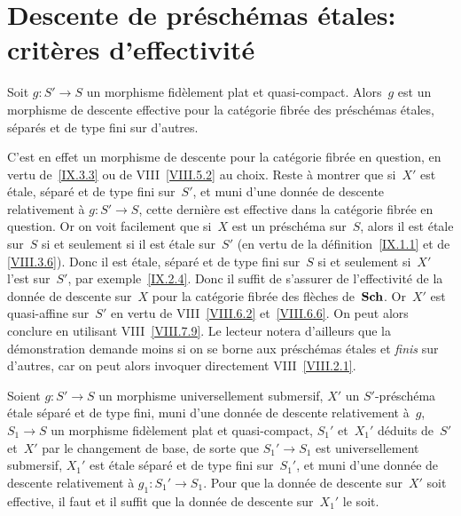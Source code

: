\section{Descente de pr\'esch\'emas \'etales: crit\`eres
d'effectivit\'e}
\label{IX.4}

\enlargethispage{.7cm}\begin{proposition}
\label{IX.4.1}
Soit $g\colon S'\to S$ un morphisme fid\`element plat et
quasi-compact. Alors~$g$ est un morphisme de descente effective pour
la cat\'egorie fibr\'ee des pr\'esch\'emas \'etales,
s\'epar\'es et de type fini sur d'autres.
\end{proposition}

C'est en effet un morphisme de descente pour la cat\'egorie
fibr\'ee en question, en vertu de~\ref{IX.3.3} ou de
VIII~\ref{VIII.5.2} au choix. Reste \`a montrer que si~$X'$ est
\'etale, s\'epar\'e et de type fini sur~$S'$, et muni d'une
donn\'ee de descente relativement \`a $g\colon S'\to S$, cette
derni\`ere est effective dans la cat\'egorie fibr\'ee en
question. Or on voit facilement que si~$X$ est un pr\'esch\'ema
sur~$S$, alors
il est \'etale sur~$S$ si et seulement si il est \'etale sur~$S'$
(en vertu de la d\'efinition~\ref{IX.1.1} et de \loccit \ref{VIII.3.6}). Donc il est \'etale, s\'epar\'e et de
type fini sur~$S$ si et seulement si~$X'$ l'est sur~$S'$, \cf par
exemple~\ref{IX.2.4}. Donc il suffit de s'assurer de
l'effectivit\'e de la donn\'ee de descente sur~$X$ pour la
cat\'egorie fibr\'ee des fl\`eches de~$\mathbf{Sch}$. Or~$X'$ est
quasi-affine sur~$S'$ en vertu de VIII~\ref{VIII.6.2}
et~\ref{VIII.6.6}. On peut alors conclure en utilisant
VIII~\ref{VIII.7.9}. Le lecteur notera d'ailleurs que la
d\'emonstration demande moins si on se borne aux pr\'esch\'emas
\'etales et \emph{finis} sur d'autres, car on peut alors invoquer
directement VIII~\ref{VIII.2.1}.

\begin{corollaire}
\label{IX.4.2}
Soient $g\colon S'\to S$ un morphisme universellement submersif, $X'$
un
$S'$-pr\'esch\'ema
\'etale s\'epar\'e et de type fini, muni d'une donn\'ee de
descente relativement \`a~$g$, $S_1\to S$ un morphisme
fid\`element plat et quasi-compact, $S_1'$ et~$X_1'$ d\'eduits
de~$S'$ et~$X'$ par le changement de base, de sorte que $S_1'\to S_1$
est universellement submersif, $X_1'$ est \'etale s\'epar\'e et
de type fini sur~$S_1'$, et muni d'une donn\'ee de descente
relativement \`a $g_1\colon S_1'\to S_1$. Pour que la donn\'ee de
descente sur~$X'$ soit effective, il faut et il suffit que la
donn\'ee de descente sur~$X_1'$ le soit.
\end{corollaire}

